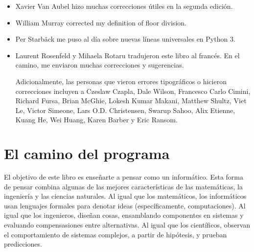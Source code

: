 \documentclass[10pt]{book}
\begin{document}
\begin{itemize}
\item Xavier Van Aubel hizo muchas correcciones útiles en la segunda
edición.

\item William Murray corrected my definition of floor division.

\item Per Starb{\"a}ck me puso al día sobre nuevas líneas universales en Python 3.

\item Laurent Rosenfeld y Mihaela Rotaru tradujeron este libro al francés.  En el camino, me enviaron muchas correcciones y sugerencias.


Adicionalmente, las personas que vieron errores tipográficos o hicieron correcciones incluyen a
Czeslaw Czapla, Dale Wilson, Francesco Carlo Cimini,
Richard Fursa, Brian McGhie, Lokesh Kumar Makani, Matthew Shultz, Viet
Le, Victor Simeone, Lars O.D. Christensen, Swarup Sahoo, Alix Etienne,
Kuang He, Wei Huang, Karen Barber y Eric Ransom.




\end{itemize}

\normalsize
\clearemptydoublepage

\begin{latexonly}

\tableofcontents

\clearemptydoublepage

\end{latexonly}

\mainmatter

\chapter{El camino del programa}

El objetivo de este libro es enseñarte a pensar como un informático. Esta forma
de pensar combina algunas de las mejores características de las matemáticas,
la ingeniería y las ciencias naturales.  Al igual que los matemáticos, los
informáticos usan lenguajes formales para denotar ideas (específicamente,
computaciones). Al igual que los ingenieros, diseñan cosas, ensamblando
componentes en sistemas y evaluando compensasiones entre alternativas.
Al igual que los científicos, observan el comportamiento de sistemas complejos,
a partir de hipótesis, y prueban predicciones.  
\end{document}
